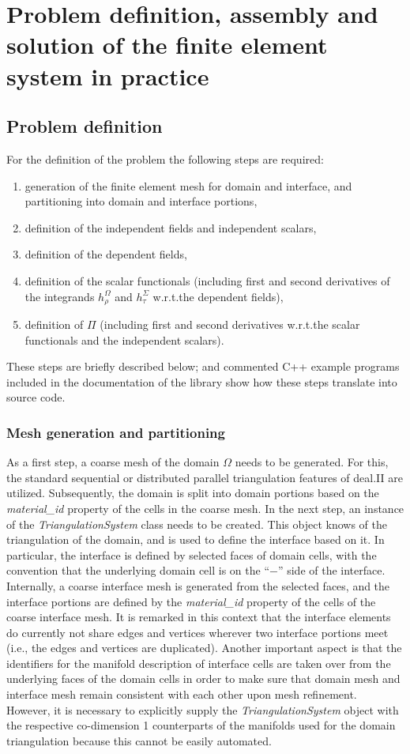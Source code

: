 \documentclass[pdftex,a4paper,12pt,abstracton]{scrartcl}
\begin{document}
\section{Problem definition, assembly and solution of the finite element system in practice}
\subsection{Problem definition}
For the definition of the problem the following steps are required:
\begin{enumerate}
 \item generation of the finite element mesh for domain and interface, and partitioning into domain and interface portions,
 \item definition of the independent fields and independent scalars,
 \item definition of the dependent fields,
 \item definition of the scalar functionals (including first and second derivatives of the integrands $h^\Omega_\rho$ and $h^\Sigma_\tau$ w.r.t.\@ the dependent fields),
 \item definition of $\Pi$ (including first and second derivatives w.r.t.\@ the scalar functionals and the independent scalars).
\end{enumerate}
These steps are briefly described below; and commented C++ example programs included in the documentation of the library show how these steps translate into source code.

\subsubsection{Mesh generation and partitioning}
As a first step, a coarse mesh of the domain $\Omega$ needs to be generated. For this, the standard sequential or distributed parallel triangulation features of deal.II are utilized. Subsequently, the domain is split into domain portions based on the \textit{material\_id} property of the cells in the coarse mesh. In the next step, an instance of the \textit{TriangulationSystem} class needs to be created. This object knows of the triangulation of the domain, and is used to define the interface based on it. In particular, the interface is defined by selected faces of domain cells, with the convention that the underlying domain cell is on the ``$-$'' side of the interface. Internally, a coarse interface mesh is generated from the selected faces, and the interface portions are defined by the \textit{material\_id} property of the cells of the coarse interface mesh. It is remarked in this context that the interface elements do currently not share edges and vertices wherever two interface portions meet (i.e., the edges and vertices are duplicated). Another important aspect is that the identifiers for the manifold description of interface cells are taken over from the underlying faces of the domain cells in order to make sure that domain mesh and interface mesh remain consistent with each other upon mesh refinement. However, it is necessary to explicitly supply the \textit{TriangulationSystem} object with the respective co-dimension 1 counterparts of the manifolds used for the domain triangulation because this cannot be easily automated.
\end{document}
